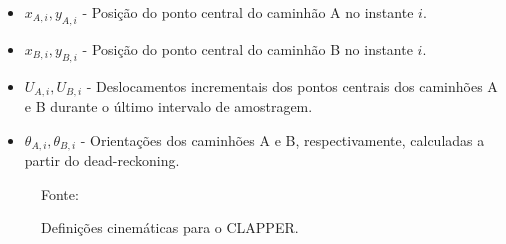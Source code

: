 \documentclass[xcolor=dvipsnames, aspectratio=169]{beamer}
\begin{document}
\begin{frame}
\begin{itemize}
    \begin{itemize}
      \item \(x_{A,i}, y_{A,i}\) - Posição do ponto central do caminhão A no instante \(i\).
      \item \(x_{B,i}, y_{B,i}\) - Posição do ponto central do caminhão B no instante \(i\).
      \item \(U_{A,i}, U_{B,i}\) - Deslocamentos incrementais dos pontos centrais dos caminhões A e B durante o último intervalo de amostragem.
      \item \(\theta_{A,i}, \theta_{B,i}\) - Orientações dos caminhões A e B, respectivamente, calculadas a partir do dead-reckoning.
    \end{itemize}      
    \newpage
    \begin{figure}
      \centering
      {Fonte: \cite{borenstein1995intemal}}
      \caption{Definições cinemáticas para o CLAPPER.}
      \label{fig:1_Kinematic_definitions_for_the_CLAPPER}
    \end{figure} 
  \end{itemize}
\end{frame}

\end{document}
